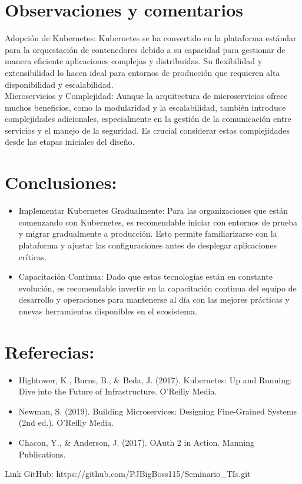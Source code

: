 \documentclass{article}
\begin{document}
\section{Observaciones y comentarios}
Adopción de Kubernetes: Kubernetes se ha convertido en la plataforma estándar para la orquestación de contenedores debido a su capacidad para gestionar de manera eficiente aplicaciones complejas y distribuidas. Su flexibilidad y extensibilidad lo hacen ideal para entornos de producción que requieren alta disponibilidad y escalabilidad.\\

Microservicios y Complejidad: Aunque la arquitectura de microservicios ofrece muchos beneficios, como la modularidad y la escalabilidad, también introduce complejidades adicionales, especialmente en la gestión de la comunicación entre servicios y el manejo de la seguridad. Es crucial considerar estas complejidades desde las etapas iniciales del diseño.\\

\section{Conclusiones:}
\begin{itemize}
    \item Implementar Kubernetes Gradualmente: Para las organizaciones que están comenzando con Kubernetes, es recomendable iniciar con entornos de prueba y migrar gradualmente a producción. Esto permite familiarizarse con la plataforma y ajustar las configuraciones antes de desplegar aplicaciones críticas.
    \item Capacitación Continua: Dado que estas tecnologías están en constante evolución, es recomendable invertir en la capacitación continua del equipo de desarrollo y operaciones para mantenerse al día con las mejores prácticas y nuevas herramientas disponibles en el ecosistema.
\end{itemize}

\section{Referecias:}
\begin{itemize}
    \item Hightower, K., Burns, B., & Beda, J. (2017). Kubernetes: Up and Running: Dive into the Future of Infrastructure. O'Reilly Media.
    \item Newman, S. (2019). Building Microservices: Designing Fine-Grained Systems (2nd ed.). O'Reilly Media.
    \item Chacon, Y., & Anderson, J. (2017). OAuth 2 in Action. Manning Publications.
\end{itemize}

Link GitHub: https://github.com/PJBigBoss115/Seminario_TIs.git
\end{document}
